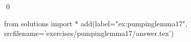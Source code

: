 
\begin{ex} 
  \label{ex:pumpinglemma17}
  
  \qed
\end{ex} 
\begin{python0}
from solutions import *
add(label="ex:pumpinglemma17",
    srcfilename='exercises/pumpinglemma17/answer.tex') 
\end{python0}
